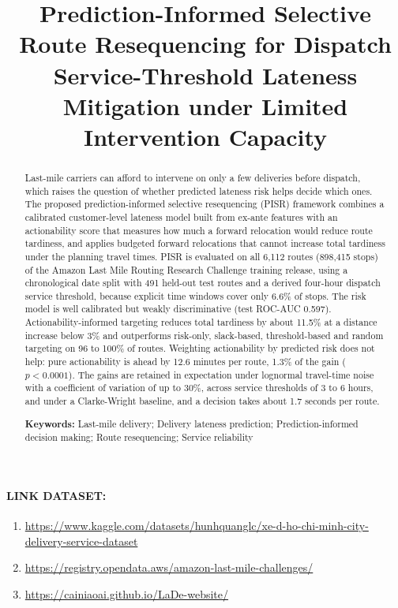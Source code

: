 \documentclass[11pt,a4paper]{article}
\title{\textbf{Prediction-Informed Selective Route Resequencing for Dispatch Service-Threshold Lateness Mitigation under Limited Intervention Capacity}}
\author{}
\date{}
\begin{document}
\maketitle

\begin{abstract}
\noindent
Last-mile carriers can afford to intervene on only a few deliveries before dispatch, which raises the question of whether predicted lateness risk helps decide which ones. The proposed prediction-informed selective resequencing (PISR) framework combines a calibrated customer-level lateness model built from ex-ante features with an actionability score that measures how much a forward relocation would reduce route tardiness, and applies budgeted forward relocations that cannot increase total tardiness under the planning travel times. PISR is evaluated on all 6,112 routes (898,415 stops) of the Amazon Last Mile Routing Research Challenge training release, using a chronological date split with 491 held-out test routes and a derived four-hour dispatch service threshold, because explicit time windows cover only 6.6\% of stops. The risk model is well calibrated but weakly discriminative (test ROC-AUC 0.597). Actionability-informed targeting reduces total tardiness by about 11.5\% at a distance increase below 3\% and outperforms risk-only, slack-based, threshold-based and random targeting on 96 to 100\% of routes. Weighting actionability by predicted risk does not help: pure actionability is ahead by 12.6 minutes per route, 1.3\% of the gain ($p < 0.0001$). The gains are retained in expectation under lognormal travel-time noise with a coefficient of variation of up to 30\%, across service thresholds of 3 to 6 hours, and under a Clarke-Wright baseline, and a decision takes about 1.7 seconds per route.

\medskip
\noindent
\textbf{Keywords:} Last-mile delivery; Delivery lateness prediction; Prediction-informed decision making; Route resequencing; Service reliability
\end{abstract}

\paragraph{LINK DATASET:}
\begin{enumerate}
  \item \href{https://www.kaggle.com/datasets/hunhquanglc/xe-d-ho-chi-minh-city-delivery-service-dataset}{https://www.kaggle.com/datasets/hunhquanglc/xe-d-ho-chi-minh-city-delivery-service-dataset}
  \item \href{https://registry.opendata.aws/amazon-last-mile-challenges/}{https://registry.opendata.aws/amazon-last-mile-challenges/}
  \item \href{https://cainiaoai.github.io/LaDe-website/}{https://cainiaoai.github.io/LaDe-website/}
\end{enumerate}
\end{document}
